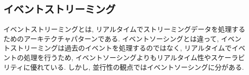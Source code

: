 \documentclass[../../../main]{subfiles}
\begin{document}
    \subsection{イベントストリーミング}\label{subsec:phraseology-event_streaming}

    イベントストリーミングとは, リアルタイムでストリーミングデータを処理するためのアーキテクチャパターンである. イベントソーシングとは違って, イベントストリーミングは過去のイベントを処理するのではなく, リアルタイムでイベントの処理を行うため, イベントソーシングよりもリアルタイム性やスケーラビリティに優れている. しかし, 並行性の観点ではイベントソーシングに分がある. \cite{イベントストリーミング}
\end{document}
